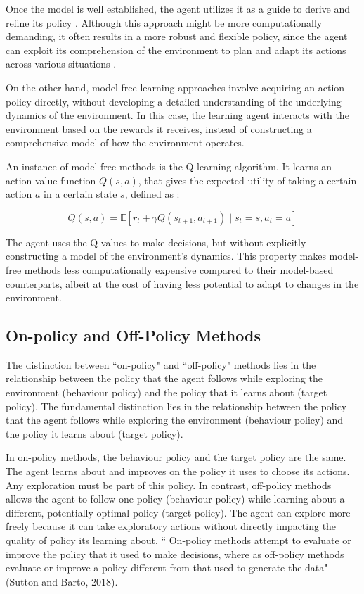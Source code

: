 Once the model is well established, the agent utilizes it as a guide to derive and refine its policy \cite{RL2}. Although this approach might be more computationally demanding, it often results in a more robust and flexible policy, since the agent can exploit its comprehension of the environment to plan and adapt its actions across various situations \cite{RL}.

On the other hand, model-free learning approaches involve acquiring an action policy directly, without developing a detailed understanding of the underlying dynamics of the environment. In this case, the learning agent interacts with the environment based on the rewards it receives, instead of constructing a comprehensive model of how the environment operates.

An instance of model-free methods is the Q-learning algorithm. It learns an action-value function $Q(s,a)$, that gives the expected utility of taking a certain action $a$ in a certain state $s$, defined as \cite{RL3}:

\[
Q(s,a) = \mathbb{E}[r_t + \gamma Q(s_{t+1}, a_{t+1}) \mid s_t=s, a_t=a]
\]

The agent uses the Q-values to make decisions, but without explicitly constructing a model of the environment's dynamics. This property makes model-free methods less computationally expensive compared to their model-based counterparts, albeit at the cost of having less potential to adapt to changes in the environment.



\subsection{On-policy and Off-Policy Methods}
The distinction between ``on-policy" and ``off-policy" methods lies in the relationship between the policy that the agent follows while exploring the environment (behaviour policy) and the policy that it learns about (target policy). 
The fundamental distinction lies in the relationship between the policy that the agent follows while exploring the environment (behaviour policy) and the policy it learns about (target policy). 

In on-policy methods, the behaviour policy and the target policy are the same. The agent learns about and improves on the policy it uses to choose its actions. Any exploration must be part of this policy. In contrast, off-policy methods allows the agent to follow one policy (behaviour policy) while learning about a different, potentially optimal policy (target policy). The agent can explore more freely because it can take exploratory actions without directly impacting the quality of policy its learning about. 
`` On-policy methods attempt to evaluate or improve the policy that it used to make decisions, where as off-policy methods evaluate or improve a policy different from that used to generate the data" (Sutton and Barto, 2018).


